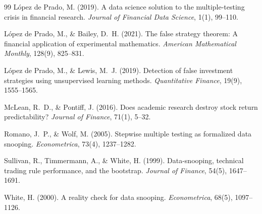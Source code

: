 \documentclass[11pt]{article}
\begin{document}
\begin{thebibliography}{99}
L\'opez de Prado, M. (2019). A data science solution to the multiple-testing crisis in financial research. \emph{Journal of Financial Data Science}, 1(1), 99--110.

L\'opez de Prado, M., \& Bailey, D.~H. (2021). The false strategy theorem: A financial application of experimental mathematics. \emph{American Mathematical Monthly}, 128(9), 825--831.

L\'opez de Prado, M., \& Lewis, M.~J. (2019). Detection of false investment strategies using unsupervised learning methods. \emph{Quantitative Finance}, 19(9), 1555--1565.

McLean, R.~D., \& Pontiff, J. (2016). Does academic research destroy stock return predictability? \emph{Journal of Finance}, 71(1), 5--32.

Romano, J.~P., \& Wolf, M. (2005). Stepwise multiple testing as formalized data snooping. \emph{Econometrica}, 73(4), 1237--1282.

Sullivan, R., Timmermann, A., \& White, H. (1999). Data-snooping, technical trading rule performance, and the bootstrap. \emph{Journal of Finance}, 54(5), 1647--1691.

White, H. (2000). A reality check for data snooping. \emph{Econometrica}, 68(5), 1097--1126.

\end{thebibliography}
\end{document}
